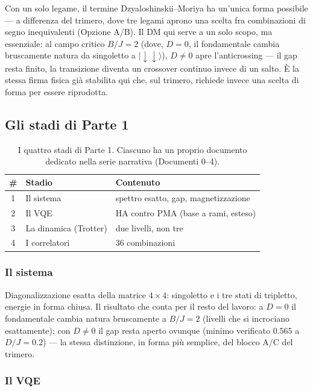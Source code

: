 \documentclass[11pt,a4paper]{article}
\newcommand{\ket}[1]{\lvert #1 \rangle}
\begin{document}
Con un solo legame, il termine Dzyaloshinskii--Moriya ha un'unica forma
possibile --- a differenza del trimero, dove tre legami aprono una
scelta fra combinazioni di segno inequivalenti (Opzione A/B). Il DM qui
serve a un solo scopo, ma essenziale: al campo critico $B/J=2$ (dove,
$D=0$, il fondamentale cambia bruscamente natura da singoletto a
$\ket{\!\downarrow\downarrow}$), $D\neq0$ apre l'anticrossing --- il gap
resta finito, la transizione diventa un crossover continuo invece di un
salto. È la stessa firma fisica già stabilita qui che, sul trimero,
richiede invece una scelta di forma per essere riprodotta.

\subsection{Gli stadi di Parte 1}
\label{sec:stadi-parte1}

\begin{table}[htbp]
\centering
\begin{tabular}{@{}cll@{}}
\toprule
\# & Stadio & Contenuto \\
\midrule
1 & Il sistema & spettro esatto, gap, magnetizzazione \\
2 & Il VQE & HA contro PMA (base a rami, esteso) \\
3 & La dinamica (Trotter) & due livelli, non tre \\
4 & I correlatori & 36 combinazioni \\
\bottomrule
\end{tabular}
\caption{I quattro stadi di Parte 1. Ciascuno ha un proprio documento
dedicato nella serie narrativa (Documenti 0--4).}
\end{table}
\FloatBarrier

\subsubsection{Il sistema}

Diagonalizzazione esatta della matrice $4\times4$: singoletto e i tre
stati di tripletto, energie in forma chiusa. Il risultato che conta per
il resto del lavoro: a $D=0$ il fondamentale cambia natura bruscamente a
$B/J=2$ (livelli che si incrociano esattamente); con $D\neq0$ il gap
resta aperto ovunque (minimo verificato $0.565$ a $D/J=0.2$) --- la
stessa distinzione, in forma più semplice, del blocco A/C del trimero.

\subsubsection{Il VQE}
\end{document}
